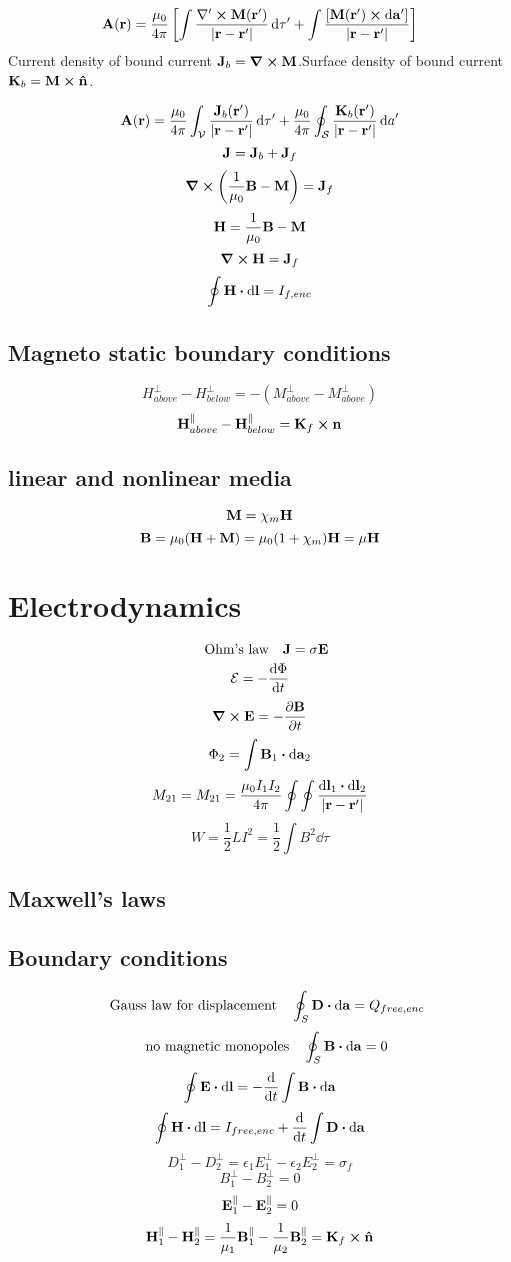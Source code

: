 \documentclass[12pt]{article}
\begin{document}
\[\vb{A}(\vb{r})=\frac{\mu_0}{4\pi}\left[\int\frac{\mathbf{\nabla'}\cp{\vb{M}(\vb{r'})}}{|\vb{r}-\vb{r}'|}\dd{\tau'}+\int\frac{[{\vb{M}(\vb{r'})}\cp\dd{\vb{a}'}]}{|\vb{r}-\vb{r}'|}\right]\]
Current density of bound current $\vb{J}_b=\curl{\vb{M}}$.Surface density of bound current $\vb{K}_b=\vb{M}\cp\vu{n}$.

\[\vb{A}(\vb{r})=\frac{\mu_0}{4\pi}\int_{\mathcal{V}}\frac{\vb{J}_b(\vb{r}')}{|\vb{r}-\vb{r}'|}\dd{\tau'}+\frac{\mu_0}{4\pi}\oint_{\mathcal{S}}\frac{\vb{K}_b(\vb{r}')}{|\vb{r}-\vb{r}'|}\dd{a}'\]
\[\vb{J}=\vb{J}_b+\vb{J}_f\]
\[\curl{\qty(\frac{1}{\mu_0}\vb{B}-\vb{M})}=\vb{J}_f\]
\[\vb{H}=\frac{1}{\mu_0}\vb{B}-\vb{M}\]
\[\curl{\vb{H}}=\vb{J}_f\]
\[\oint\vb{H}\vdot\dd{\vb{l}}=I_{f,enc}\]
\subsection*{Magneto static boundary conditions}
\[H_{above}^{\perp}-H_{below}^{\perp}=-(M_{above}^{\perp}-M_{above}^{\perp})\]
\[\vb{H}_{above}^{\parallel}-\vb{H}_{below}^{\parallel}=\vb{K}_f\cp\vb{n}\]
\subsection*{linear and nonlinear media}
\[\vb{M}=\chi_m\vb{H}\]
\[\vb{B}=\mu_0(\vb{H}+\vb{M})=\mu_0(1+\chi_m)\vb{H}=\mu\vb{H}\]
\section{Electrodynamics}
\[\qq{Ohm's law} \vb{J}=\sigma\vb{E}\]
\[\mathcal{E}=-\dv{\Phi}{t}\]
\[\curl{\vb{E}}=-\pdv{\vb{B}}{t}\]
\[\Phi_2=\int\vb{B}_1\vdot\dd{\vb{a}_2}\]
\[M_{21}=M_{21}=\frac{\mu_0I_1I_2}{4\pi}\oint\oint\frac{\dd{\vb{l}_1}\vdot\dd{\vb{l}_2}}{|\vb{r}-\vb{r}' |}\]
\[W=\frac{1}{2}LI^2=\frac{1}{2}\int B^2\dd{\tau}\]
\subsection*{Maxwell's laws}

\subsection*{Boundary conditions}
\[\qq{Gauss law for displacement}\oint_{S}\vb{D}\vdot\dd{\vb{a}}=Q_{free,enc}\]
\[\qq{no magnetic monopoles}\oint_{S}\vb{B}\vdot\dd{\vb{a}}=0\]
\[\oint\vb{E}\vdot\dd{\vb{l}}=-\dv{t}\int\vb{B}\vdot\dd{\vb{a}}\]
\[\oint\vb{H}\vdot\dd{\vb{l}}=I_{free,enc}+\dv{t}\int\vb{D}\vdot\dd{\vb{a}}\]
\[D_{1}^{\perp}-D_{2}^{\perp}=\epsilon_1E_{1}^{\perp}-\epsilon_2E_{2}^{\perp}=\sigma_f\]
\[B_{1}^{\perp}-B_{2}^{\perp}=0\]
\[\vb{E}_{1}^{\parallel}-\vb{E}_{2}^{\parallel}=0\]
\[\vb{H}_{1}^{\parallel}-\vb{H}_{2}^{\parallel}=\frac{1}{\mu_1}\vb{B}_{1}^{\parallel}-\frac{1}{\mu_2}\vb{B}_{2}^{\parallel}=\vb{K}_f\cp\vu{n}\]
\end{document}
